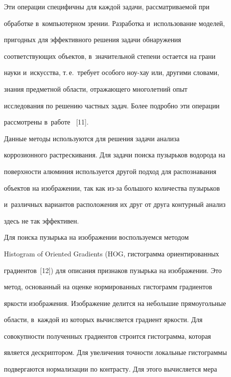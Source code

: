    


   Эти операции специфичны для каждой задачи, рассматриваемой при 


обработке в~компьютерном зрении. Разработка и~использование моделей, 


пригодных для эффективного решения задачи обнаружения 


соответствующих объектов, в~значительной степени остается на грани 


науки и~искусства, т.\,е.\ требует особого ноу-хау или, другими словами, 


знания предметной области, отражающего многолетний опыт 


исследования по решению частных задач. Более подробно эти операции 


рассмотрены в~работе~ [11].


    


   Данные методы используются для решения задачи анализа 


коррозионного растрескивания. Для задачи поиска пузырьков водорода на 


поверхности алюминия используется другой подход для распознавания 


объектов на изображении, так как из-за большого количества пузырьков 


и~различных вариантов расположения их друг от друга контурный анализ 


здесь не так эффективен.


   


   Для поиска пузырька на изображении воспользуемся методом 


Histogram of Oriented Gradients (HOG, гистограмма ориентированных 


градиентов~[12]) для описания признаков пузырька на изображении. Это 


метод, основанный на оценке нормированных гистограмм градиентов 


яркости изображения. Изображение делится на небольшие прямоугольные 


области, в~каждой из которых вычисляется градиент яркости. Для 


совокупности полученных градиентов строится гистограмма, которая 


является дескриптором. Для увеличения точности локальные гистограммы 


подвергаются нормализации по контрасту. Для этого вычисляется мера 


